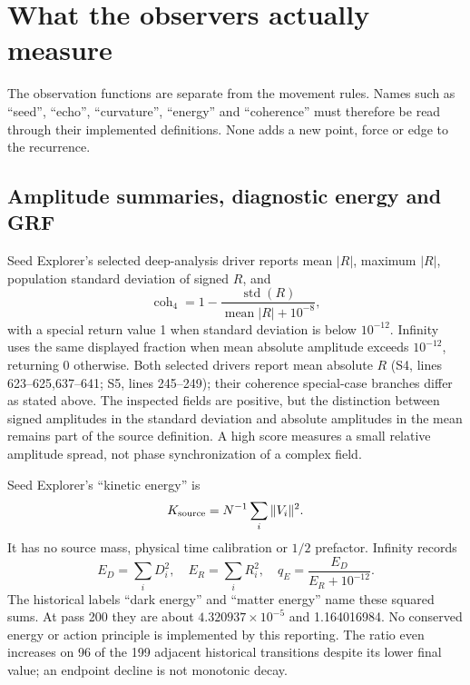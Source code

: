 \documentclass[11pt,a4paper]{article}
\newcommand{\src}[2]{\textsf{#1}, lines #2}
\begin{document}
\section{What the observers actually measure}
\label{sec:observers}
The observation functions are separate from the movement rules. Names such as ``seed'', ``echo'', ``curvature'', ``energy'' and ``coherence'' must therefore be read through their implemented definitions. None adds a new point, force or edge to the recurrence.

\subsection{Amplitude summaries, diagnostic energy and GRF}
Seed Explorer's selected deep-analysis driver reports mean $|R|$, maximum $|R|$, population standard deviation of signed $R$, and
\begin{equation}
\operatorname{coh}_4=1-\frac{\operatorname{std}(R)}{\operatorname{mean}|R|+10^{-8}},\label{eq:coh4}
\end{equation}
with a special return value 1 when standard deviation is below $10^{-12}$. Infinity uses the same displayed fraction when mean absolute amplitude exceeds $10^{-12}$, returning 0 otherwise. Both selected drivers report mean absolute $R$ (\src{S4}{623--625,637--641}; \src{S5}{245--249}); their coherence special-case branches differ as stated above. The inspected fields are positive, but the distinction between signed amplitudes in the standard deviation and absolute amplitudes in the mean remains part of the source definition. A high score measures a small relative amplitude spread, not phase synchronization of a complex field.

Seed Explorer's ``kinetic energy'' is
\begin{equation}
K_{\rm source}=N^{-1}\sum_i\|V_i\|^2.\label{eq:K}
\end{equation}
It has no source mass, physical time calibration or $1/2$ prefactor. Infinity records
\begin{equation}
E_D=\sum_iD_i^2,\quad E_R=\sum_iR_i^2,\quad q_E=\frac{E_D}{E_R+10^{-12}}.\label{eq:energy}
\end{equation}
The historical labels ``dark energy'' and ``matter energy'' name these squared sums. At pass 200 they are about $4.320937\times10^{-5}$ and 1.164016984. No conserved energy or action principle is implemented by this reporting. The ratio even increases on 96 of the 199 adjacent historical transitions despite its lower final value; an endpoint decline is not monotonic decay.
\end{document}
